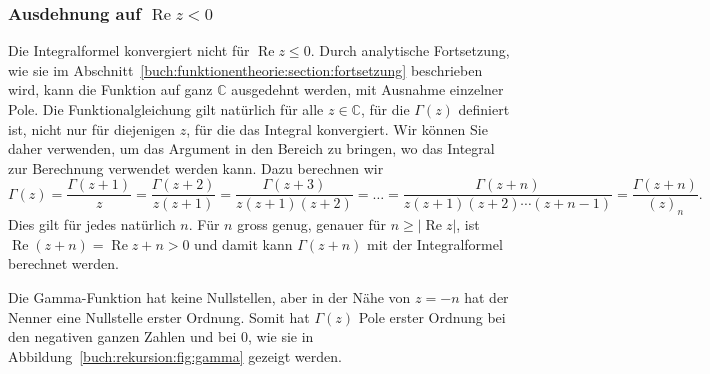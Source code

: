 %
%
\subsubsection{Ausdehnung auf $\operatorname{Re}z<0$}
%
%
Die Integralformel konvergiert nicht für $\operatorname{Re}z\le 0$.
Durch analytische Fortsetzung, wie sie im
Abschnitt~\ref{buch:funktionentheorie:section:fortsetzung}
beschrieben wird, kann die Funktion auf ganz $\mathbb{C}$ ausgedehnt
werden, mit Ausnahme einzelner Pole.
Die Funktionalgleichung gilt natürlich für alle $z\in\mathbb{C}$,
für die $\Gamma(z)$ definiert ist, nicht nur für diejenigen $z$, für
die das Integral konvergiert. 
Wir können Sie daher verwenden, um das Argument in den Bereich
zu bringen, wo das Integral zur Berechnung verwendet werden kann.
Dazu berechnen wir
\[
\Gamma(z)
=
\frac{\Gamma(z+1)}{z}
=
\frac{\Gamma(z+2)}{z(z+1)}
=
\frac{\Gamma(z+3)}{z(z+1)(z+2)}
=
\dots
=
\frac{\Gamma(z+n)}{z(z+1)(z+2)\cdots(z+n-1)}
=
\frac{\Gamma(z+n)}{(z)_n}.
\]
Dies gilt für jedes natürlich $n$.
Für $n$ gross genug, genauer für 
$n\ge |\operatorname{Re}z|$,
ist $\operatorname{Re}(z+n)=\operatorname{Re}z + n>0$ und damit
kann $\Gamma(z+n)$ mit der Integralformel berechnet werden.

Die Gamma-Funktion hat keine Nullstellen, aber in der Nähe von $z=-n$
hat der Nenner eine Nullstelle erster Ordnung.
Somit hat $\Gamma(z)$ Pole erster Ordnung bei den negativen
ganzen Zahlen und bei $0$, wie sie in
Abbildung~\ref{buch:rekursion:fig:gamma} gezeigt werden.

%
%
